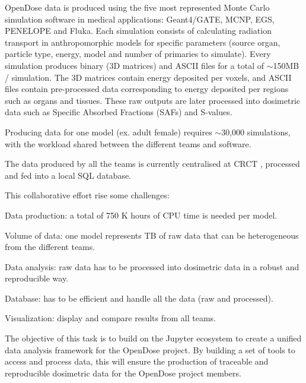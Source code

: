 \begin{task}[
  title=Nuclear Medicine application,
  id=opendose-analysis,
  lead=INSERM,
  PM=24,
  wphases={0-24},
  partners={INSERM}
]
  OpenDose data is produced using the five most represented Monte Carlo
  simulation software in medical applications: Geant4/GATE, MCNP, EGS, PENELOPE
  and Fluka. Each simulation consists of calculating radiation transport in
  anthropomorphic models for specific parameters (source organ, particle type,
  energy, model and number of primaries to simulate). Every simulation produces
  binary (3D matrices) and ASCII files for a total of $\sim$150MB / simulation.
  The 3D matrices contain energy deposited per voxels, and ASCII files contain
  pre-processed data corresponding to energy deposited per regions such as
  organs and tissues. These raw outputs are later processed into dosimetric
  data such as Specific Absorbed Fractions (SAFs) and S-values.

  Producing data for one model (ex. adult female) requires $\sim$30,000
  simulations, with the workload shared between the different teams and
  software.

  The data produced by all the teams is currently centralised at CRCT
  ,
  processed and fed into a local  SQL database.

  This collaborative effort rise  some challenges:
  \begin{compactitem}
  \item Data production: a total of 750 K hours of CPU time is needed per
    model. 
  \item Volume of data: one model represents TB of raw data that can be
    heterogeneous from the different teams.
  \item Data analysis: raw data has to be processed into dosimetric data in a
    robust and reproducible way.
  \item Database: has to be efficient and handle all the data (raw and
    processed).
  \item Visualization: display and compare results from all teams.
  \end{compactitem}

  The objective of this task is to build on the Jupyter ecosystem to create a
  unified data analysis framework for the OpenDose project. By building a set
  of tools to access and process data, this will ensure the production of
  traceable and reproducible dosimetric data for the OpenDose project members.


\end{task}

